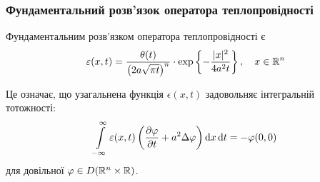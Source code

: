 \subsubsection{Фундаментальний розв'язок оператора теплопровідності}

\begin{theorem}
	Фундаментальним розв'язком оператора теплопровідності є
	\begin{equation}
		\varepsilon(x,t)=\frac{\theta(t)}{\left(2a\sqrt{\pi t}\right)^n} \cdot \exp\left\{ - \frac{|x|^2}{4a^2t} \right\}, \quad x \in \mathbb{R}^n
	\end{equation}
\end{theorem}

\begin{remark}
	Це означає, що узагальнена функція $\epsilon(x,t)$ задовольняє інтегральній тотожності:
	\begin{equation}
		\displaystyle\int\limits_{-\infty}^\infty \varepsilon(x,t) \left(\frac{\partial \varphi}{\partial t} + a^2\Delta\varphi\right)\mathop{}\!\mathrm{d} x\mathop{}\!\mathrm{d} t=-\varphi(0,0)
	\end{equation}
	для довільної $\varphi\in D(\mathbb{R}^n\times\mathbb{R})$.
\end{remark}

